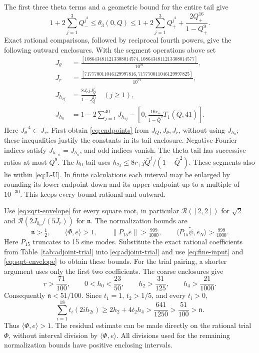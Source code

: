 \documentclass[a4paper,11pt]{article}
\numberwithin{equation}{section}
\theoremstyle{definition}
\theoremstyle{remark}
\newcommand{\norm}[1]{\lVert#1\rVert}
\newcommand{\ip}[2]{\langle#1,#2\rangle}
\begin{document}
The first three theta terms and a geometric bound for the entire tail give
\[
 1+2\sum_{j=1}^3 Q_-^{j^2}\le\theta_3(0,Q)
 \le1+2\sum_{j=1}^3 Q_+^{j^2}+\frac{2Q_+^{16}}{1-Q_+^9}.
\]
Exact rational comparisons, followed by reciprocal fourth powers, give the
following outward enclosures. With the segment operations above set
\begin{equation}\label{eq:fine-input}
\begin{aligned}
 J_\theta&=\frac{[1086434811213308014574,1086434811213308014577]}{10^{21}},\\
 J_r&=\frac{[717770011046129997816,717770011046129997825]}{10^{21}},\\
 J_{h_{2j}}&=\frac{8J_rjJ_Q^j}{1-J_Q^{2j}}\quad(j\ge1),\\
 J_{h_0}&=1-2\sum_{j=1}^{40}J_{h_{2j}}
 -\left[0,\frac{16r_+}{1-\bar Q^2}T_1(\bar Q,41)\right].
\end{aligned}
\end{equation}
Here $J_\theta^{-4}\subset J_r$. First obtain \eqref{eq:endpoints} from
$J_Q,J_\theta,J_r$, without using $J_{h_0}$; these inequalities justify the
constants in its tail enclosure. Negative Fourier indices satisfy
$J_{h_{-n}}=J_{h_n}$, and odd indices vanish. The theta tail has successive
ratios at most $Q^9$. The $h_0$ tail uses
$h_{2j}\le8r_+j\bar Q^j/(1-\bar Q^2)$. These segments also lie within
\eqref{eq:L-U}. In finite calculations each interval may be enlarged by
rounding its lower endpoint down and its upper endpoint up to a multiple of
$10^{-30}$. This keeps every bound rational and outward.

Use \eqref{eq:sqrt-envelope} for every square root, in particular $\mathcal R([2,2])$ for $\sqrt2$ and $\mathcal R(2J_{h_0}/(5J_r))$ for $\mathfrak n$. The normalization bounds are
\[
 \mathfrak n>\tfrac12,\qquad
 \ip\Phi e>1,\qquad
 \norm{P_{15}e}>\tfrac{999}{1000},\qquad
 \ip{P_{15}\widetilde\psi}{e_N}>\tfrac{999}{1000}.
\]
Here $P_{15}$ truncates to 15 sine modes. Substitute the exact rational
coefficients from Table~\ref{tab:adjoint-trial} into \eqref{eq:adjoint-trial}
and use \eqref{eq:fine-input} and \eqref{eq:sqrt-envelope} to obtain these bounds.
For the trial pairing, a shorter argument uses only the first two coefficients.
The coarse enclosures give
\[
 r>\frac{71}{100},\qquad 0<h_0<\frac{23}{50},\qquad
 h_2>\frac{31}{125},\qquad h_4>\frac{21}{1000}.
\]
Consequently $\mathfrak n<51/100$. Since $t_1=1$, $t_2>1/5$, and every $t_i>0$,
\[
 \sum_{i=1}^{18}t_i(2ih_{2i})\ge2h_2+4t_2h_4>
 \frac{641}{1250}>\frac{51}{100}>\mathfrak n.
\]
Thus $\ip\Phi e>1$. The residual estimate can be made directly on the rational
trial $\Phi$, without interval division by $\ip\Phi e$.
All divisions used for the remaining normalization bounds have positive enclosing intervals.
\end{document}
